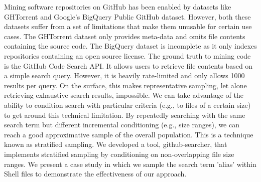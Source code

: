 Mining software repositories on GitHub has been enabled by datasets like GHTorrent and Google's BigQuery Public GitHub dataset.
However, both these datasets suffer from a set of limitations that make them unusable for certain use cases.
The GHTorrent dataset only provides meta-data and omits file contents containing the source code.
The BigQuery dataset is incomplete as it only indexes repositories containing an open source license.
The ground truth to mining code is the GitHub Code Search API.
It allows users to retrieve file contents based on a simple search query.
However, it is heavily rate-limited and only allows 1000 results per query.
On the surface, this makes representative sampling, let alone retrieving exhaustive search results, impossible.
We can take advantage of the ability to condition search with particular criteria (e.g., to files of a certain size) to get around this technical limitation.
By repeatedly searching with the same search term but different incremental conditioning (e.g., size ranges), we can reach a good approximative sample of the overall population.
This is a technique known as stratified sampling. 
We developed a tool, github-searcher, that implements stratified sampling by conditioning on non-overlapping file size ranges.
We present a case study in which we sample the search term 'alias' within Shell files to demonstrate the effectiveness of our approach.